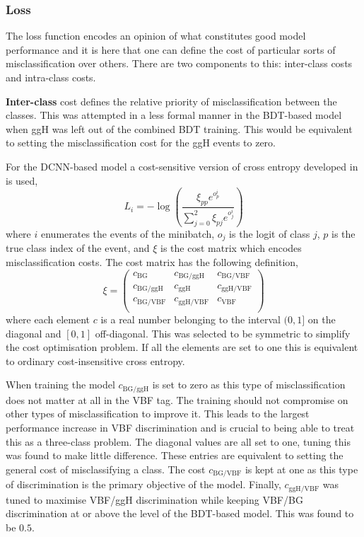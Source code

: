 \subsubsection{Loss}
The loss function encodes an opinion of what constitutes good model performance and it is here that one can define the cost of particular sorts of misclassification over others. 
There are two components to this: inter-class costs and intra-class costs. 

\textbf{Inter-class} cost defines the relative priority of misclassification between the classes. 
This was attempted in a less formal manner in the BDT-based model when ggH was left out of the combined BDT training. 
This would be equivalent to setting the misclassification cost for the ggH events to zero. 

For the DCNN-based model a cost-sensitive version of cross entropy developed in \cite{CostSensitivity} is used,
\begin{equation}
    L_i = -\log\left(\frac{\xi_{pp}e^{o^{i}_{p}}}{\sum_{j=0}^{2}\xi_{pj}e^{o^{i}_{j}}}\right)
\end{equation} 
where $i$ enumerates the events of the minibatch, $o_j$ is the logit of class $j$, $p$ is the true class index of the event, and $\xi$ is the cost matrix which encodes misclassification costs.
The cost matrix has the following definition,
\begin{equation}
    \xi = \begin{pmatrix}
        c_{\mathrm{BG}} & c_{\mathrm{BG}/\mathrm{ggH}} & c_{\mathrm{BG}/\mathrm{VBF}} \\
        c_{\mathrm{BG}/\mathrm{ggH}} & c_{\mathrm{ggH}} & c_{\mathrm{ggH}/\mathrm{VBF}} \\
        c_{\mathrm{BG}/\mathrm{VBF}} & c_{\mathrm{ggH}/\mathrm{VBF}} & c_{\mathrm{VBF}} \\
    \end{pmatrix}
\end{equation}
where each element $c$ is a real number belonging to the interval $(0,1]$ on the diagonal and $[0,1]$ off-diagonal. 
This was selected to be symmetric to simplify the cost optimisation problem.
If all the elements are set to one this is equivalent to ordinary cost-insensitive cross entropy. 

When training the model $c_{\mathrm{BG}/\mathrm{ggH}}$ is set to zero as this type of misclassification does not matter at all in the VBF tag. 
The training should not compromise on other types of misclassification to improve it. 
This leads to the largest performance increase in VBF discrimination and is crucial to being able to treat this as a three-class problem.
The diagonal values are all set to one, tuning this was found to make little difference. These entries are equivalent to setting the general cost of misclassifying a class.
The cost $c_{\mathrm{BG}/\mathrm{VBF}}$ is kept at one as this type of discrimination is the primary objective of the model. 
Finally, $c_{\mathrm{ggH}/\mathrm{VBF}}$ was tuned to maximise VBF/ggH discrimination while keeping VBF/BG discrimination at or above the level of the BDT-based model. This was found to be $0.5$.

